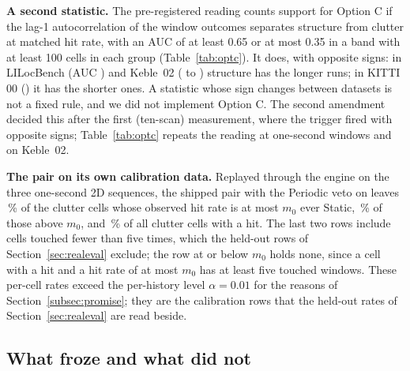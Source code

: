 \noindent\textbf{A second statistic.} The pre-registered reading counts support for Option C if the lag-1 autocorrelation of the window outcomes separates structure from clutter at matched hit rate, with an AUC of at least 0.65 or at most 0.35 in a band with at least 100 cells in each group (Table~\ref{tab:optc}). It does, with opposite signs: in LILocBench (AUC \CalOptcLil) and Keble~02 (\CalOptcKebLo{} to \CalOptcKebHi) structure has the longer runs; in KITTI 00 (\CalOptcKth) it has the shorter ones. A statistic whose sign changes between datasets is not a fixed rule, and we did not implement Option C. The second amendment decided this after the first (ten-scan) measurement, where the trigger fired with opposite signs; Table~\ref{tab:optc} repeats the reading at one-second windows and on Keble~02.

\noindent\textbf{The pair on its own calibration data.} Replayed through the engine on the three one-second 2D sequences, the shipped pair with the Periodic veto on leaves \CalRepLe\,\% of the \CalRepNle{} clutter cells whose observed hit rate is at most $m_0$ ever Static, \CalRepGt\,\% of those above $m_0$, and \CalRepAll\,\% of all \CalRepN{} clutter cells with a hit. The last two rows include cells touched fewer than five times, which the held-out rows of Section~\ref{sec:realeval} exclude; the row at or below $m_0$ holds none, since a cell with a hit and a hit rate of at most $m_0$ has at least five touched windows. These per-cell rates exceed the per-history level $\alpha=0.01$ for the reasons of Section~\ref{subsec:promise}; they are the calibration rows that the held-out rates of Section~\ref{sec:realeval} are read beside.

\subsection{What froze and what did not}\label{subsec:froze}

